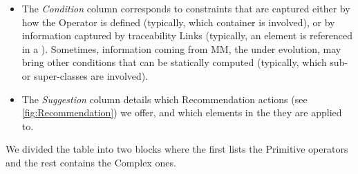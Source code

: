 \begin{itemize}
 
	\item The \textsl{Condition} column corresponds to constraints that are captured
	either by how the \textsf{Operator} is defined (typically, which \textsf{container}
	is involved), or by information captured by traceability \textsf{Link}s (typically,
	an element is referenced in a \viewtype). Sometimes, information coming from \textsf{MM},
	the \metamodel under evolution, may bring other conditions that can be statically
	computed (typically, which sub- or super-classes are involved).%
	
	\item The \textsl{Suggestion} column details which \textsf{Recommendation} actions (see \cref{fig:Recommendation}) we offer, and which elements in the \viewtype they are applied to.
\end{itemize}
We divided the table into two blocks where the first lists the \textsf{Primitive} operators and the rest contains the \textsf{Complex} ones.

